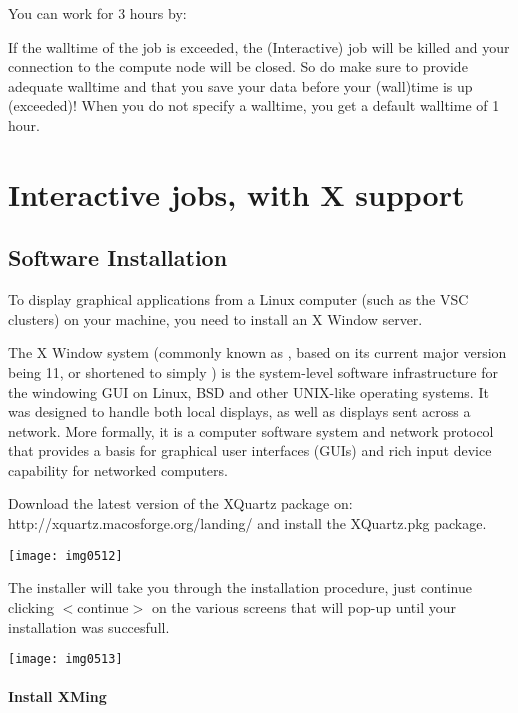 You can work for 3 hours by:
\begin{prompt}
\end{prompt}

If the walltime of the job is exceeded, the (Interactive) job will be killed
and your connection to the compute node will be closed. So do make sure to
provide adequate walltime and that you save your data before your (wall)time is
up (exceeded)!  When you do not specify a walltime, you get a default walltime
of 1 hour.

\section{Interactive jobs, with X support}

\subsection{Software Installation}

To display graphical applications from a Linux computer (such as the VSC
clusters) on your machine, you need to install an X Window server.

The X Window system (commonly known as , based on its current major
version being 11, or shortened to simply ) is the system-level
software infrastructure for the windowing GUI on Linux, BSD and other UNIX-like
operating systems. It was designed to handle both local displays, as well as
displays sent across a network. More formally, it is a computer software system
and network protocol that provides a basis for graphical user interfaces (GUIs)
and rich input device capability for networked computers.

\ifmac
Download the latest version of the XQuartz package on:
http://xquartz.macosforge.org/landing/
and install the XQuartz.pkg package.

\texttt{[image: img0512]}

The installer will take you through the installation procedure, just continue
clicking $<$continue$>$ on the various screens that will pop-up until your
installation was succesfull.

\texttt{[image: img0513]}
\fi

\ifwindows
\paragraph{ Install XMing}


